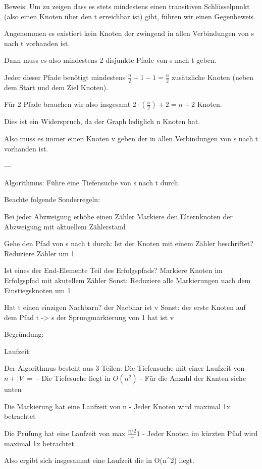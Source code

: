 Beweis:
Um zu zeigen dass es stets mindestens einen transitiven Schlüsselpunkt (also einen Knoten über den t erreichbar ist) gibt, führen wir einen  Gegenbeweis.

Angenommen es existiert kein Knoten der zwingend in allen Verbindungen von s nach t vorhanden ist.

Dann muss es also mindestens 2 disjunkte Pfade von s nach t geben.

Jeder dieser Pfade benötigt mindestens $ \frac{n}{2} +1 -1 = \frac{n}{2} $ zusätzliche Knoten (neben dem Start und dem Ziel Knoten).

Für 2 Pfade brauchen wir also insgesamt $ 2 \cdot (\frac{n}{2}) + 2 = n +2$ Knoten.

Dies ist ein Widerspruch, da der Graph lediglich n Knoten hat.

Also muss es immer einen Knoten v geben der in allen Verbindungen von s nach t vorhanden ist.

---

Algorithmus:
Führe eine Tiefensuche von s nach t durch.

	Beachte folgende Sonderregeln:

	Bei jeder Abzweigung erhöhe einen Zähler
	Markiere den Elternknoten der Abzweigung mit aktuellem Zählerstand


Gehe den Pfad von s nach t durch:
	Ist der Knoten mit einem Zähler beschriftet?
		Reduziere Zähler um 1
	
		Ist eines der End-Elemente Teil des Erfolgspfads?
			Markiere Knoten im Erfolgspfad mit akutellem Zähler
		Sonst:
			Reduziere alle Markierungen nach dem Einstiegsknoten um 1

Hat t einen einzigen Nachbarn?
	der Nacbhar ist v
Sonst:
	der erste Knoten auf dem Pfad t -> s der Sprungmarkierung von 1 hat ist v

Begründung:

Laufzeit:

Der Algorithmus besteht aus 3 Teilen:
	Die Tiefensuche mit einer Laufzeit von $ n + |V|= $ 
		- Die Tiefesuche liegt in $ O(n^2)$ 
		- Für die Anzahl der Kanten siehe unten
	
	Die Markierung hat eine Laufzeit von n
		- Jeder Knoten wird maximal 1x betrachtet

	Die Prüfung hat eine Laufzeit von max $\frac{n/2} - 1 $
		- Jeder Knoten im kürzten Pfad wird maximal 1x betrachtet

Also ergibt sich insgesammt eine Laufzeit die in O(n^2) liegt.

